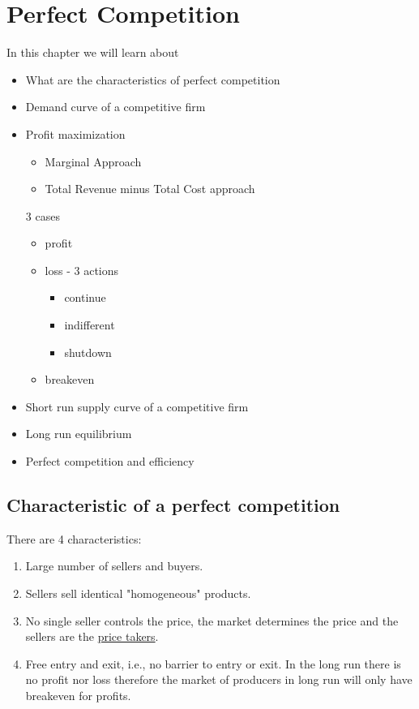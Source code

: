 \documentclass[../ECON-281-Notes.tex]{subfiles}
\begin{document}
\chapter{Perfect Competition}
In this chapter we will learn about 
\begin{itemize}
  \item What are the characteristics of perfect competition 
  \item Demand curve of a competitive firm 
  \item Profit maximization 
  \begin{itemize}
    \item Marginal Approach
    \item Total Revenue minus Total Cost approach
  \end{itemize}
  3 cases
  \begin{itemize}
    \item profit
    \item loss - 3 actions
    \begin{itemize}
      \item continue
      \item indifferent
      \item shutdown
    \end{itemize}
    \item breakeven
  \end{itemize}
  \item Short run supply curve of a competitive firm
  \item Long run equilibrium 
  \item Perfect competition and efficiency
\end{itemize}

\section{Characteristic of a perfect competition}
There are 4 characteristics:
\begin{enumerate}
  \item Large number of sellers and buyers.
  \item Sellers sell identical "homogeneous" products.
  \item No single seller controls the price, the market determines the price and the sellers are the \underline{price takers}.
  \item Free entry and exit, i.e., no barrier to entry or exit. In the long run there is no profit nor loss therefore the market of producers in long run  will only have breakeven for profits.
\end{enumerate}
\end{document}

